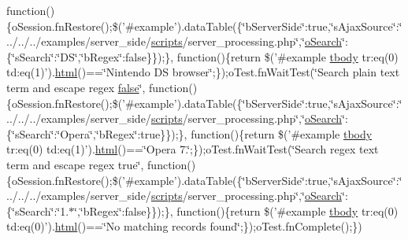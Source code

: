 \begin{DoxyCompactItemize}
function()\{o\+Session.\+fn\+Restore();\$('\#example').data\+Table(\{\char`\"{}b\+Server\+Side\char`\"{}\+:true,\char`\"{}s\+Ajax\+Source\char`\"{}\+:\char`\"{}../../../examples/server\+\_\+side/\hyperlink{tinymce_8jquery_8dev_8js_a09066d4d580eeec222f858d588b4cdef}{scripts}/server\+\_\+processing.\+php\char`\"{},\char`\"{}\hyperlink{model_8search_8js_a85bb7e502bb77d88d1b8ca92c902420c}{o\+Search}\char`\"{}\+:\{\char`\"{}s\+Search\char`\"{}\+:\char`\"{}D\+S\char`\"{},\char`\"{}b\+Regex\char`\"{}\+:false\}\});\}, function()\{return \$('\#example \hyperlink{core_8constructor_8js_a99b0542c7c50fe8757c55bf9dac5f3be}{tbody} tr\+:eq(0) td\+:eq(1)').\hyperlink{tinymce_8jquery_8dev_8js_ac2090bcf2ff968c0083d5de53a6544f3}{html}()==\char`\"{}Nintendo D\+S browser\char`\"{};\});o\+Test.\+fn\+Wait\+Test(\char`\"{}Search plain text term and escape regex \hyperlink{validate_8js_a5df37b7f02e5cdc7d9412b7f872b8e01}{false}\char`\"{}, function()\{o\+Session.\+fn\+Restore();\$('\#example').data\+Table(\{\char`\"{}b\+Server\+Side\char`\"{}\+:true,\char`\"{}s\+Ajax\+Source\char`\"{}\+:\char`\"{}../../../examples/server\+\_\+side/\hyperlink{tinymce_8jquery_8dev_8js_a09066d4d580eeec222f858d588b4cdef}{scripts}/server\+\_\+processing.\+php\char`\"{},\char`\"{}\hyperlink{model_8search_8js_a85bb7e502bb77d88d1b8ca92c902420c}{o\+Search}\char`\"{}\+:\{\char`\"{}s\+Search\char`\"{}\+:\char`\"{}Opera\char`\"{},\char`\"{}b\+Regex\char`\"{}\+:true\}\});\}, function()\{return \$('\#example \hyperlink{core_8constructor_8js_a99b0542c7c50fe8757c55bf9dac5f3be}{tbody} tr\+:eq(0) td\+:eq(1)').\hyperlink{tinymce_8jquery_8dev_8js_ac2090bcf2ff968c0083d5de53a6544f3}{html}()==\char`\"{}Opera 7.\char`\"{};\});o\+Test.\+fn\+Wait\+Test(\char`\"{}Search regex text term and escape regex true\char`\"{}, function()\{o\+Session.\+fn\+Restore();\$('\#example').data\+Table(\{\char`\"{}b\+Server\+Side\char`\"{}\+:true,\char`\"{}s\+Ajax\+Source\char`\"{}\+:\char`\"{}../../../examples/server\+\_\+side/\hyperlink{tinymce_8jquery_8dev_8js_a09066d4d580eeec222f858d588b4cdef}{scripts}/server\+\_\+processing.\+php\char`\"{},\char`\"{}\hyperlink{model_8search_8js_a85bb7e502bb77d88d1b8ca92c902420c}{o\+Search}\char`\"{}\+:\{\char`\"{}s\+Search\char`\"{}\+:\char`\"{}1.$\ast$\char`\"{},\char`\"{}b\+Regex\char`\"{}\+:false\}\});\}, function()\{return \$('\#example \hyperlink{core_8constructor_8js_a99b0542c7c50fe8757c55bf9dac5f3be}{tbody} tr\+:eq(0) td\+:eq(0)').\hyperlink{tinymce_8jquery_8dev_8js_ac2090bcf2ff968c0083d5de53a6544f3}{html}()==\char`\"{}No matching records found\char`\"{};\});o\+Test.\+fn\+Complete();\})
\end{DoxyCompactItemize}


